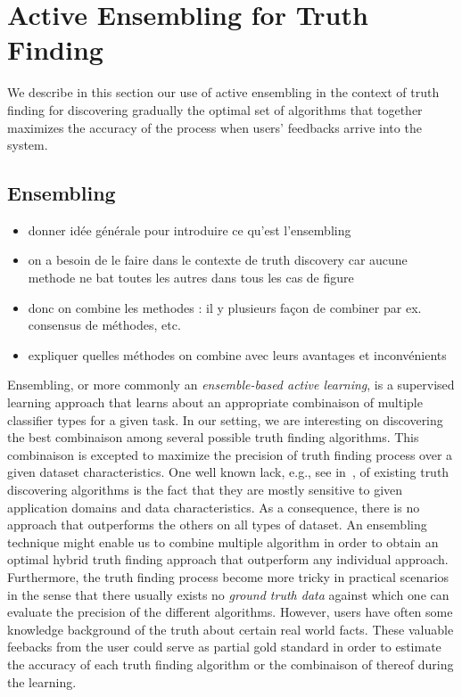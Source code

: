 \section{Active Ensembling for Truth Finding}
We describe in this section our use of active ensembling in the context of truth finding
for discovering gradually the optimal set of algorithms that together maximizes the accuracy
of the process when users' feedbacks arrive into the system.

\subsection{Ensembling }
\begin{itemize}
\item donner idée générale pour introduire  ce qu'est l'ensembling
\item on a besoin de le faire dans le contexte de truth discovery car aucune methode ne bat toutes les autres dans tous les cas de figure
\item donc on combine les methodes : il y plusieurs façon de combiner par ex. consensus de méthodes, etc.
\item expliquer quelles méthodes on combine avec leurs avantages et inconvénients
\end{itemize}


Ensembling, or more commonly an \emph{ensemble-based active learning}, is a supervised learning approach that learns
about an appropriate combinaison of multiple classifier types for a given task. In our setting, we are interesting
on discovering the best combinaison among several possible truth finding algorithms. This combinaison is excepted 
to maximize the precision of truth finding process over a given dataset characteristics.
One well known lack, e.g., see in~\cite{Li12, Wagui14}, of existing truth discovering algorithms is the fact that
they are mostly sensitive to given application domains and data characteristics. As a consequence, there is no approach 
that outperforms the others on all types of dataset.  An ensembling technique might enable  us to combine multiple algorithm
in order to obtain an optimal hybrid truth finding approach that outperform any individual approach. Furthermore, the truth
finding process become more tricky in practical scenarios in the sense that there usually exists no \emph{ground truth data}
against which one can evaluate the precision of the different algorithms. However, users have often some knowledge background
of the truth about certain real world facts. These valuable feebacks from the user could serve as partial gold standard in order
to estimate the accuracy of each truth finding algorithm or the combinaison of thereof during the learning.

